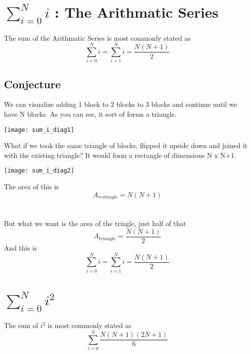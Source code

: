 \documentclass[11pt]{book}
\begin{document}
\section{$\sum\limits_{i=0}^N{i}$ : The Arithmatic Series}
The sum of the Arithmatic Series is most commonly stated as
\[\sum_{i=0}^N i= \sum_{i=1}^N i = \frac{N(N+1)}{2} \]

\subsection{Conjecture}
We can visualize adding 1 block to 2 blocks to 3 blocks and continue until we have N blocks.  As you can see, it sort of forms a triangle. \\
\begin{center}
\texttt{[image: sum\_i\_diag1]}
\end{center}
What if we took the same triangle of blocks, flipped it upside down and joined it with the existing triangle?  It would form a rectangle of dimensions N x N+1. \\
\begin{center}
\texttt{[image: sum\_i\_diag2]}
\end{center}
The area of this is \[A_{rectangle} = N(N+1)\] \\
\\
But what we want is the area of the tringle, just half of that \[A_{triangle}=\frac{N(N+1)}{2}\]
And this is \[ \sum_{i=0}^N i= \sum_{i=1}^N i = \frac{N(N+1)}{2}\]


\section{$\sum\limits_{i=0}^N{i^2}$}
The sum of \(i^2\) is most commonly stated as
\[\sum\limits_{i=0}^N{\frac{N(N+1)(2N+1)}{6}}\]
\end{document}
